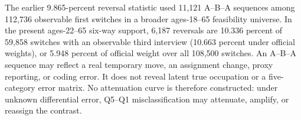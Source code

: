 The earlier 9.865-percent reversal statistic used 11,121 A--B--A sequences
among 112,736 observable first switches in a broader ages-18--65 feasibility
universe.  In the present ages-22--65 six-way support, 6,187 reversals are 10.336
percent of 59,858 switches with an observable third interview (10.663 percent
under official weights), or 5.948 percent of official weight over all 108,500
switches.  An A--B--A sequence may reflect a real temporary move, an assignment
change, proxy reporting, or coding error.  It does not reveal latent true
occupation or a five-category error matrix.  No attenuation curve is therefore
constructed: under unknown differential error, Q5--Q1 misclassification may
attenuate, amplify, or reassign the contrast.
\FloatBarrier
